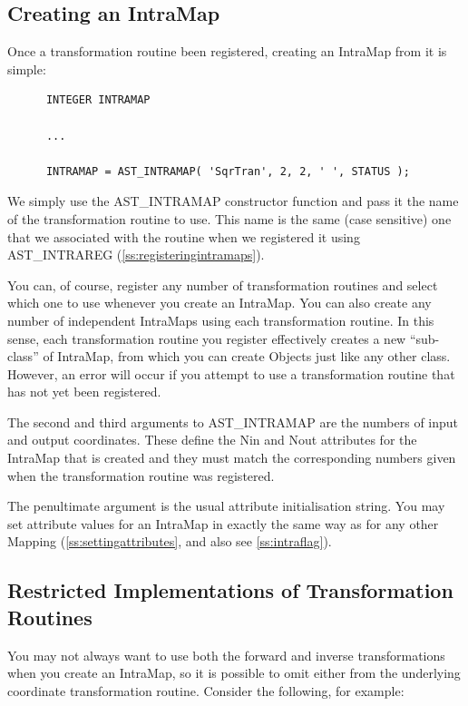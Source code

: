 \documentclass[twoside,11pt]{article}
\newcommand{\htmlref}[2]{#1}
\newcommand{\secref}[1]{\S\ref{#1}}
\renewcommand{\secref}[1]{\ref{#1}}
\begin{document}
\subsection{Creating an IntraMap}

Once a transformation routine been registered, creating an \htmlref{IntraMap}{IntraMap}
from it is simple:

\small
\begin{verbatim}
      INTEGER INTRAMAP

      ...

      INTRAMAP = AST_INTRAMAP( 'SqrTran', 2, 2, ' ', STATUS );
\end{verbatim}
\normalsize

We simply use the \htmlref{AST\_INTRAMAP}{AST_INTRAMAP} constructor function and pass it the
name of the transformation routine to use. This name is the same (case
sensitive) one that we associated with the routine when we registered
it using \htmlref{AST\_INTRAREG}{AST_INTRAREG} (\secref{ss:registeringintramaps}).

You can, of course, register any number of transformation routines and
select which one to use whenever you create an IntraMap. You can also
create any number of independent IntraMaps using each transformation
routine. In this sense, each transformation routine you register
effectively creates a new ``sub-class'' of IntraMap, from which you
can create Objects just like any other class. However, an error will
occur if you attempt to use a transformation routine that has not yet
been registered.

The second and third arguments to AST\_INTRAMAP are the numbers of
input and output coordinates. These define the \htmlref{Nin}{Nin} and \htmlref{Nout}{Nout} attributes
for the IntraMap that is created and they must match the corresponding
numbers given when the transformation routine was registered.

The penultimate argument is the usual attribute initialisation
string. You may set attribute values for an IntraMap in exactly the
same way as for any other \htmlref{Mapping}{Mapping} (\secref{ss:settingattributes}, and
also see \secref{ss:intraflag}).

\subsection{\label{ss:restrictedintramaps}Restricted Implementations of Transformation Routines}

You may not always want to use both the forward and inverse
transformations when you create an \htmlref{IntraMap}{IntraMap}, so it is possible to omit
either from the underlying coordinate transformation routine. Consider
the following, for example:
\end{document}
